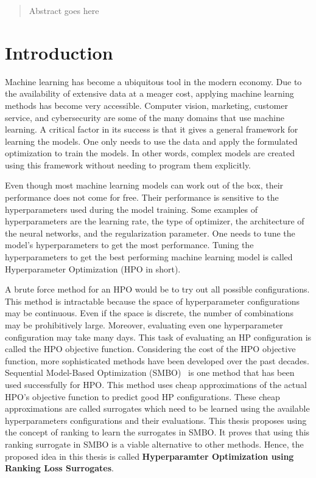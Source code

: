\documentclass[12pt, twoside, ngerman]{report}
\begin{document}
\newpage
{}
\begin{abstract}

Abstract goes here

\end{abstract}

\newpage

\tableofcontents
\newpage
\newpage


\chapter{Introduction}

Machine learning has become a ubiquitous tool in the modern economy. 
Due to the availability of extensive data at a meager cost, applying machine learning methods has become very accessible.
Computer vision, marketing, customer service, and cybersecurity are some of the many domains that use machine learning. A critical factor in its success is that it gives a general framework for learning the models. One only needs to use the data and apply the formulated optimization to train the models. In other words, complex models are created using this framework without needing to program them explicitly.

Even though most machine learning models can work out of the box, their performance does not come for free. Their performance is sensitive to the hyperparameters used during the model training. Some examples of hyperparameters are the learning rate, the type of optimizer, the architecture of the neural networks, and the regularization parameter.
One needs to tune the model's hyperparameters to get the most performance. Tuning the hyperparameters to get the best performing machine learning model is called Hyperparameter Optimization (HPO in short).

A brute force method for an HPO would be to try out all possible configurations. This method is intractable because the space of hyperparameter configurations may be continuous. Even if the space is discrete, the number of combinations may be prohibitively large. Moreover, evaluating even one hyperparameter configuration may take many days. This task of evaluating an HP configuration is called the HPO objective function. Considering the cost of the HPO objective function, more sophisticated methods have been developed over the past decades. Sequential Model-Based Optimization (SMBO)~\cite{NIPS2011_86e8f7ab} is one method that has been used successfully for HPO. This method uses cheap approximations of the actual HPO's objective function to predict good HP configurations. These cheap approximations are called surrogates which need to be learned using the available hyperparameters configurations and their evaluations. This thesis proposes using the concept of ranking to learn the surrogates in SMBO. It proves that using this ranking surrogate in SMBO is a viable alternative to other methods.
Hence, the proposed idea in this thesis is called \textbf{Hyperparamter Optimization using Ranking Loss Surrogates}.
\end{document}
